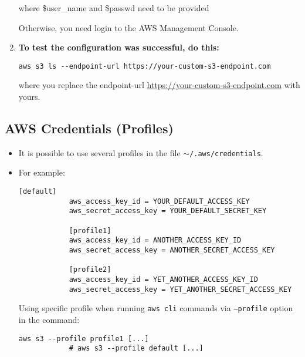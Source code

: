 \documentclass[12pt, a4paper]{article}
\numberwithin{equation}{section}
\theoremstyle{definition}
\theoremstyle{definition}
\begin{document}
\begin{enumerate}
		where \$user\_name and \$passwd need to be provided
		
		Otherwise, you need login to the AWS Management Console. 
		
		\item \textbf{To test the configuration was successful, do this:}
		
		\begin{lstlisting}[style=mystylebash, label=alg:aws_configure_test, xleftmargin=\parindent]
			aws s3 ls --endpoint-url https://your-custom-s3-endpoint.com
		\end{lstlisting}
		
		where you replace the endpoint-url \url{https://your-custom-s3-endpoint.com} with yours.
		
	\end{enumerate}

	\subsection{AWS Credentials (Profiles)}
	
	\begin{itemize}
		\item It is possible to use several profiles in the file \texttt{$\sim$/.aws/credentials}. 
		\item For example:
		
		\begin{lstlisting}[style=mystylebash, label=alg:aws_profiles, xleftmargin=\parindent]
			[default]
			aws_access_key_id = YOUR_DEFAULT_ACCESS_KEY
			aws_secret_access_key = YOUR_DEFAULT_SECRET_KEY
			
			[profile1]                                                                   
			aws_access_key_id = ANOTHER_ACCESS_KEY_ID
			aws_secret_access_key = ANOTHER_SECRET_ACCESS_KEY
			
			[profile2]
			aws_access_key_id = YET_ANOTHER_ACCESS_KEY_ID
			aws_secret_access_key = YET_ANOTHER_SECRET_ACCESS_KEY
		\end{lstlisting}
	
		Using specific profile when running \texttt{aws cli} commands via \texttt{--profile} option in the command:
		
		\begin{lstlisting}[style=mystylebash, label=alg:aws_cli__profile, xleftmargin=\parindent]
			aws s3 --profile profile1 [...]
			# aws s3 --profile default [...]
		\end{lstlisting}
		
	\end{itemize}
\end{document}
